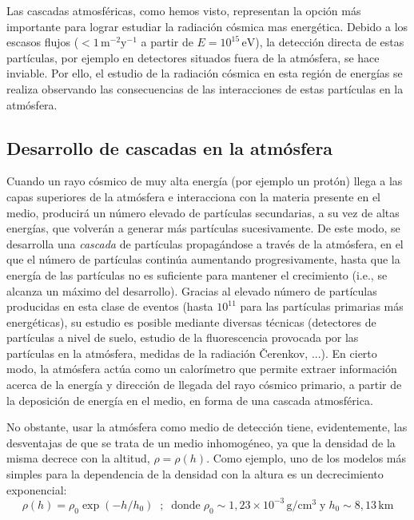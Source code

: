 \documentclass[12 pt, a4paper]{article} %
\numberwithin{equation}{section}
\numberwithin{figure}{section}
\numberwithin{table}{section}
\begin{document}
Las cascadas atmosféricas, como hemos visto, representan la opción más importante para lograr estudiar la radiación cósmica mas energética. Debido a los escasos flujos ($<1\,\mathrm{m^{-2}y^{-1}}$ a partir de $E=10^{15}\,\mathrm{eV}$), la detección directa de estas partículas, por ejemplo en detectores situados fuera de la atmósfera, se hace inviable. Por ello, el estudio de la radiación cósmica en esta región de energías se realiza observando las consecuencias de las interacciones de estas partículas en la atmósfera. 

\subsection{Desarrollo de cascadas en la atmósfera}\label{sec21}

Cuando un rayo cósmico de muy alta energía (por ejemplo un protón) llega a las capas superiores de la atmósfera e interacciona con la materia presente en el medio, producirá un número elevado de partículas secundarias, a su vez de altas energías, que volverán a generar más partículas sucesivamente. De este modo, se desarrolla una \textit{cascada} de partículas propagándose a través de la atmósfera, en el que el número de partículas continúa aumentando progresivamente, hasta que la energía de las partículas no es suficiente para mantener el crecimiento (i.e., se alcanza un máximo del desarrollo). Gracias al elevado número de partículas producidas en esta clase de eventos (hasta $10^{11}$ para las partículas primarias más energéticas), su estudio es posible mediante diversas técnicas (detectores de partículas a nivel de suelo, estudio de la fluorescencia provocada por las partículas en la atmósfera, medidas de la radiación \v{C}erenkov, ...). En cierto modo, la atmósfera actúa como un calorímetro que permite extraer información acerca de la energía y dirección de llegada del rayo cósmico primario, a partir de la deposición de energía en el medio, en forma de una cascada atmosférica.

No obstante, usar la atmósfera como medio de detección tiene, evidentemente, las desventajas de que se trata de un medio inhomogéneo, ya que la densidad de la misma decrece con la altitud, $\rho = \rho(h)$. Como ejemplo, uno de los modelos más simples para la dependencia de la densidad con la altura es un decrecimiento exponencial:
\begin{equation}
	\rho(h)=\rho_0\exp\left(-h/h_0\right)\; \;;\;\;\text{donde}\;\rho_0\sim1,23\times 10^{-3}\,\mathrm{g/cm^3}\;\text{y}\;h_0\sim8,13\,\mathrm{km}\label{ec21}
\end{equation}
\end{document}
